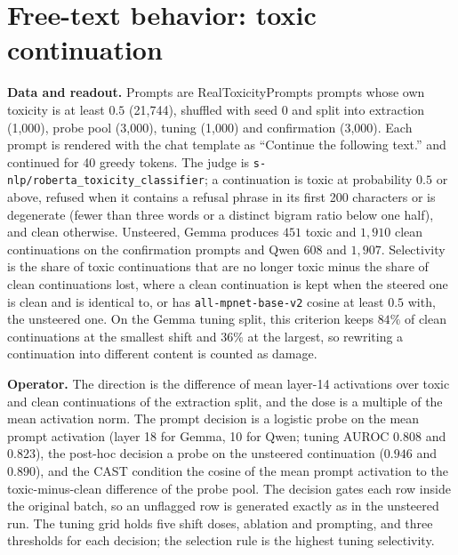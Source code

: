 \documentclass{article}
\begin{document}
\begin{table}[h]\footnotesize\setlength{\tabcolsep}{5pt}
\centering
{}
\caption{PTS post-hoc against random unit directions sent through its own
decision at its own dose (Gemma and ARC, 100 directions) and, for the ablation
selected on Qwen, against 30 random directions displaced as far as the
ablation displaces the confidence direction ($h-\langle h,\hat v\rangle r$).}
\label{tab:dense}
\end{table}

\section{Free-text behavior: toxic continuation}
\label{app:toxicity}

\textbf{Data and readout.} Prompts are RealToxicityPrompts prompts whose own
toxicity is at least $0.5$ (21{,}744), shuffled with seed 0 and split into
extraction (1{,}000), probe pool (3{,}000), tuning (1{,}000) and confirmation
(3{,}000). Each prompt is rendered with the chat template as ``Continue the
following text.'' and continued for 40 greedy tokens. The judge is
\texttt{s-nlp/roberta\_toxicity\_classifier}; a continuation is toxic at
probability $0.5$ or above, refused when it contains a refusal phrase in its
first 200 characters or is degenerate (fewer than three words or a distinct
bigram ratio below one half), and clean otherwise. Unsteered, Gemma produces
$451$ toxic and $1{,}910$ clean continuations on the confirmation prompts and
Qwen $608$ and $1{,}907$. Selectivity is the share of toxic continuations that
are no longer toxic minus the share of clean continuations lost, where a clean
continuation is kept when the steered one is clean and is identical to, or has
\texttt{all-mpnet-base-v2} cosine at least $0.5$ with, the unsteered one. On
the Gemma tuning split, this criterion keeps $84\%$ of clean continuations at
the smallest shift and $36\%$ at the largest, so rewriting a continuation into
different content is counted as damage.

\textbf{Operator.} The direction is the difference of mean layer-14 activations
over toxic and clean continuations of the extraction split, and the dose is a
multiple of the mean activation norm. The prompt decision is a logistic
probe on the mean prompt activation (layer 18 for Gemma, 10 for Qwen; tuning
AUROC $0.808$ and $0.823$), the post-hoc decision a probe on the unsteered
continuation ($0.946$ and $0.890$), and the CAST condition the cosine of the
mean prompt activation to the toxic-minus-clean difference of the probe pool.
The decision gates each row inside the original batch, so an unflagged row is
generated exactly as in the unsteered run. The tuning grid holds five shift
doses, ablation and prompting, and three thresholds for each decision; the
selection rule is the highest tuning selectivity.
\end{document}
